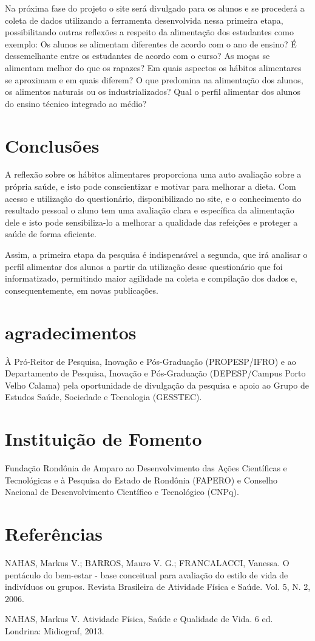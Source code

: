\documentclass[article,12pt,onesidea,4paper,english,brazil]{abntex2}
\begin{document}
Na próxima fase do projeto o site será divulgado para os alunos e se procederá a coleta de dados utilizando a ferramenta desenvolvida nessa primeira etapa, possibilitando outras reflexões a respeito da alimentação dos estudantes como exemplo: Os alunos se alimentam diferentes de acordo com o ano de ensino? É dessemelhante entre os estudantes de acordo com o curso? As moças se alimentam melhor do que os rapazes? Em quais aspectos os hábitos alimentares se aproximam e em quais diferem? O que predomina na alimentação dos alunos, os alimentos naturais ou os industrializados? Qual o perfil alimentar dos alunos do ensino técnico integrado ao médio?
	
	\section*{Conclusões}
	
A reflexão sobre os hábitos alimentares proporciona uma auto avaliação sobre a própria saúde, e isto pode conscientizar e motivar para melhorar a dieta. Com acesso e utilização do questionário, disponibilizado no site, e o conhecimento do resultado pessoal o aluno tem uma avaliação clara e específica da alimentação dele e isto pode sensibiliza-lo a melhorar a qualidade das refeições e proteger a saúde de forma eficiente.	

Assim, a primeira etapa da pesquisa é indispensável a segunda, que irá analisar o perfil alimentar dos alunos a partir da utilização desse questionário que foi informatizado, permitindo maior agilidade na coleta e compilação dos dados e, consequentemente, em novas publicações.

	\section*{agradecimentos}
	
	À Pró-Reitor de Pesquisa, Inovação e Pós-Graduação (PROPESP/IFRO) e ao Departamento de Pesquisa, Inovação e Pós-Graduação (DEPESP/Campus Porto Velho Calama) pela oportunidade de divulgação da pesquisa e apoio ao Grupo de Estudos Saúde, Sociedade e Tecnologia (GESSTEC).
	
	\section*{Instituição de Fomento}
	
Fundação Rondônia de Amparo ao Desenvolvimento das Ações Científicas e Tecnológicas e à Pesquisa do Estado de Rondônia (FAPERO) e Conselho Nacional de Desenvolvimento Científico e Tecnológico (CNPq).
	
	\section*{Referências}
	
	\noindent NAHAS, Markus V.; BARROS, Mauro V. G.; FRANCALACCI, Vanessa. O pentáculo do bem-estar - base conceitual para avaliação do estilo de vida de indivíduos ou grupos. Revista Brasileira de Atividade Física e Saúde. Vol. 5, N. 2, 2006.
	
	\noindent NAHAS, Markus V. Atividade Física, Saúde e Qualidade de Vida. 6 ed. Londrina: Midiograf, 2013.
	
\end{document}
